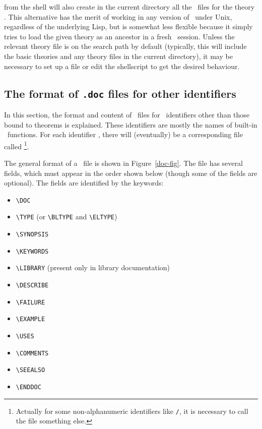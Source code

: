 \noindent\qquad {}\sp{}

\medskip

\noindent from the shell will also create in the current directory all the
\doc\ files for the theory . This alternative has the merit
of working in any version of \HOL\ under Unix, regardless of the underlying
Lisp, but is somewhat less flexible because it simply tries to load the given
theory as an ancestor in a fresh \HOL\ session. Unless the relevant theory file
is on the search path by default (typically, this will include the basic
theories and any theory files in the current directory), it may be necessary to
set up a  file or edit the shellscript to get the desired
behaviour.

\subsection{The format of {\tt .doc} files for other identifiers}
\label{othsec}

In this section, the format and content of \doc\ files for \ML\ identifiers
other than those bound to theorems is explained.  These identifiers are mostly
the names of built-in \ML\ functions.  For each identifier , there
will (eventually) be a corresponding file called \doc\footnote
{Actually for some non-alphanumeric identifiers like {\tt /}, it is necessary
to call the file something else.}.

The general format of a \doc\ file is shown in Figure~\ref{doc-fig}.  The file
has several fields, which must appear in the order shown below (though some of
the fields are optional). The fields are identified by the keywords:

\begin{itemize}
\item {\small\verb!\DOC!}
\item {\small\verb!\TYPE!} (or {\small\verb!\BLTYPE!} and {\small\verb!\ELTYPE!})
\item {\small\verb!\SYNOPSIS!}
\item {\small\verb!\KEYWORDS!}
\item {\small\verb!\LIBRARY!} (present only in library documentation)
\item {\small\verb!\DESCRIBE!}
\item {\small\verb!\FAILURE!}
\item {\small\verb!\EXAMPLE!}
\item {\small\verb!\USES!}
\item {\small\verb!\COMMENTS!}
\item {\small\verb!\SEEALSO!}
\item {\small\verb!\ENDDOC!}
\end{itemize}

